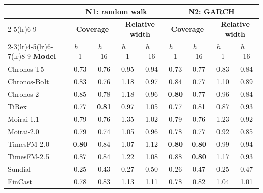 \begin{tabular}{@{}lcccccccc@{}}
\toprule
 & \multicolumn{4}{c}{\textbf{N1: random walk}} & \multicolumn{4}{c}{\textbf{N2: GARCH}} \\
\cmidrule(lr){2-5}\cmidrule(lr){6-9}
 & \multicolumn{2}{c}{\textbf{Coverage}} & \multicolumn{2}{c}{\textbf{Relative width}} & \multicolumn{2}{c}{\textbf{Coverage}} & \multicolumn{2}{c}{\textbf{Relative width}} \\
\cmidrule(lr){2-3}\cmidrule(lr){4-5}\cmidrule(lr){6-7}\cmidrule(lr){8-9}
\textbf{Model} & $h$ = 1 & $h$ = 16 & $h$ = 1 & $h$ = 16 & $h$ = 1 & $h$ = 16 & $h$ = 1 & $h$ = 16 \\
\midrule
Chronos-T5 & 0.73 & 0.76 & 0.95 & 0.94 & 0.73 & 0.77 & 0.83 & 0.84 \\
Chronos-Bolt & 0.83 & 0.76 & 1.18 & 0.97 & 0.84 & 0.77 & 1.10 & 0.89 \\
Chronos-2 & 0.85 & 0.78 & 1.18 & 0.96 & \textbf{0.80} & 0.77 & 0.96 & 0.84 \\
TiRex & 0.77 & \textbf{0.81} & 0.97 & 1.05 & 0.77 & 0.81 & 0.87 & 0.93 \\
Moirai-1.1 & 0.79 & 0.76 & 1.35 & 1.02 & 0.79 & 0.76 & 1.23 & 0.92 \\
Moirai-2.0 & 0.79 & 0.74 & 1.05 & 0.96 & 0.78 & 0.77 & 0.92 & 0.85 \\
TimesFM-2.0 & \textbf{0.80} & 0.84 & 1.07 & 1.12 & \textbf{0.80} & \textbf{0.80} & 0.99 & 0.94 \\
TimesFM-2.5 & 0.87 & 0.84 & 1.22 & 1.08 & 0.88 & \textbf{0.80} & 1.17 & 0.93 \\
Sundial & 0.25 & 0.43 & 0.27 & 0.50 & 0.26 & 0.47 & 0.25 & 0.47 \\
FinCast & 0.78 & 0.83 & 1.13 & 1.11 & 0.78 & 0.82 & 1.04 & 1.01 \\
\bottomrule
\end{tabular}
